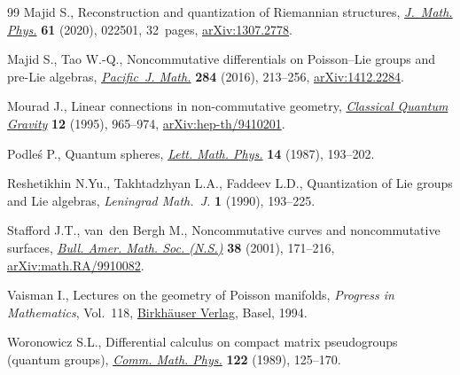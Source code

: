 \documentclass[pdftex]{sigma}
\numberwithin{equation}{section}
\newcommand{\<}{{\langle}}
\renewcommand{\>}{{\rangle}}
\begin{document}
\begin{thebibliography}{99}
Majid S., Reconstruction and quantization of {R}iemannian structures,
 \href{https://doi.org/10.1063/1.5123258}{\textit{J.~Math. Phys.}} \textbf{61} (2020), 022501, 32~pages,
 \href{https://arxiv.org/abs/1307.2778}{arXiv:1307.2778}.

Majid S., Tao W.-Q., Noncommutative differentials on {P}oisson--{L}ie groups and
 pre-{L}ie algebras, \href{https://doi.org/10.2140/pjm.2016.284.213}{\textit{Pacific~J. Math.}} \textbf{284} (2016), 213--256,
 \href{https://arxiv.org/abs/1412.2284}{arXiv:1412.2284}.

Mourad J., Linear connections in non-commutative geometry, \href{https://doi.org/10.1088/0264-9381/12/4/007}{\textit{Classical
 Quantum Gravity}} \textbf{12} (1995), 965--974, \href{https://arxiv.org/abs/hep-th/9410201}{arXiv:hep-th/9410201}.

Podle\'s P., Quantum spheres, \href{https://doi.org/10.1007/BF00416848}{\textit{Lett. Math. Phys.}} \textbf{14} (1987),
 193--202.

Reshetikhin N.Yu., Takhtadzhyan L.A., Faddeev L.D., Quantization of {L}ie groups
 and {L}ie algebras, \textit{Leningrad Math.~J.} \textbf{1} (1990), 193--225.

Stafford J.T., van~den Bergh M., Noncommutative curves and noncommutative
 surfaces, \href{https://doi.org/10.1090/S0273-0979-01-00894-1}{\textit{Bull. Amer. Math. Soc. (N.S.)}} \textbf{38} (2001),
 171--216, \href{https://arxiv.org/abs/math.RA/9910082}{arXiv:math.RA/9910082}.

Vaisman I., Lectures on the geometry of {P}oisson manifolds, \textit{Progress
 in Mathematics}, Vol.~118, \href{https://doi.org/10.1007/978-3-0348-8495-2}{Birkh\"auser Verlag}, Basel, 1994.

Woronowicz S.L., Differential calculus on compact matrix pseudogroups (quantum
 groups), \href{https://doi.org/10.1007/BF01221411}{\textit{Comm. Math. Phys.}} \textbf{122} (1989), 125--170.

\end{thebibliography}\LastPageEnding
\end{document}

